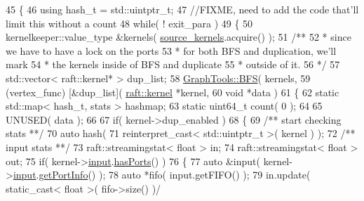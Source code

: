 \begin{DoxyCode}
45 \{
46    \textcolor{keyword}{using} hash\_t = std::uintptr\_t;
47    \textcolor{comment}{//FIXME, need to add the code that'll limit this without a count}
48    \textcolor{keywordflow}{while}( ! exit\_para )
49    \{
50       kernelkeeper::value\_type &kernels( \hyperlink{classbasic__parallel_a969b8832b2f6eaea5e985d4582d9e4dc}{source\_kernels}.acquire() );\textcolor{comment}{}
51 \textcolor{comment}{      /**}
52 \textcolor{comment}{       * since we have to have a lock on the ports}
53 \textcolor{comment}{       * for both BFS and duplication, we'll mark}
54 \textcolor{comment}{       * the kernels inside of BFS and duplicate}
55 \textcolor{comment}{       * outside of it.}
56 \textcolor{comment}{       */}
57       std::vector< raft::kernel* > dup\_list;
58       \hyperlink{class_graph_tools_ade51007699cbd681c1a37946609c46ee}{GraphTools::BFS}(  kernels,
59                         (vertex\_func) [&dup\_list]( \hyperlink{classraft_1_1kernel}{raft::kernel} *kernel,
60                                            \textcolor{keywordtype}{void} *data )
61                         \{
62                            \textcolor{keyword}{static} std::map< hash\_t, stats > hashmap;
63                            \textcolor{keyword}{static} uint64\_t count( 0 );
64 
65                            UNUSED( data );
66 
67                            \textcolor{keywordflow}{if}( kernel->dup\_enabled )
68                            \{\textcolor{comment}{}
69 \textcolor{comment}{                              /** start checking stats **/}
70                               \textcolor{keyword}{auto} hash(
71                                  reinterpret\_cast< std::uintptr\_t >( kernel ) );\textcolor{comment}{}
72 \textcolor{comment}{                              /** input  stats **/}
73                               raft::streamingstat< float > in;
74                               raft::streamingstat< float > out;
75                               \textcolor{keywordflow}{if}( kernel->\hyperlink{classraft_1_1kernel_a6edbe35a56409d402e719b3ac36d6554}{input}.\hyperlink{class_port_a7042f5b5c2ab14c9591a4984811a6012}{hasPorts}() )
76                               \{
77                                  \textcolor{keyword}{auto} &input( kernel->\hyperlink{classraft_1_1kernel_a6edbe35a56409d402e719b3ac36d6554}{input}.\hyperlink{class_port_a4af1cb062940ca3b83c569f024b9a8d1}{getPortInfo}() );
78                                  \textcolor{keyword}{auto} *fifo( input.getFIFO() );
79                                  in.update( static\_cast< float >( fifo->size() )/ 

\end{DoxyCode}
